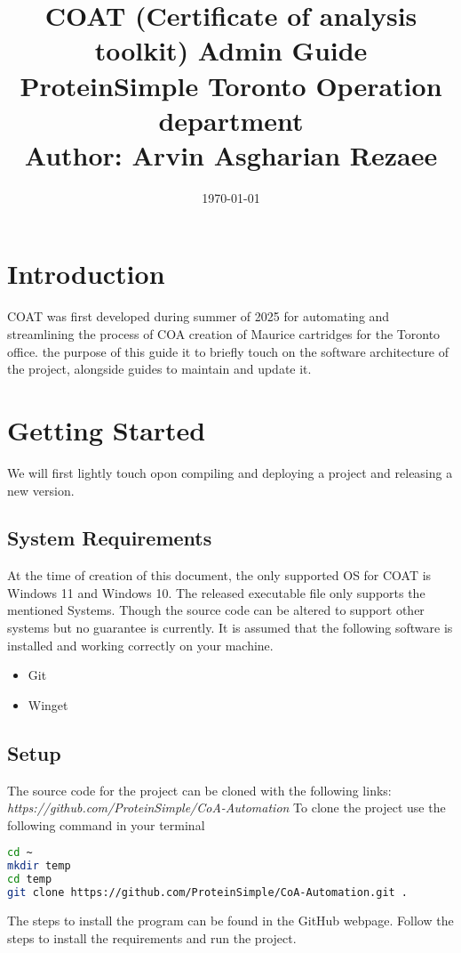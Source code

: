 \documentclass[12pt,a4paper]{article}
\title{
  \Huge \textbf{
    COAT (Certificate of analysis toolkit) Admin Guide} \\
    \vspace{1em}
  \large ProteinSimple Toronto Operation department \\
  \large Author: Arvin Asgharian Rezaee
  }
\author{}
\date{\today}
\begin{document}
\maketitle
\thispagestyle{empty}
\clearpage

\tableofcontents
\clearpage

\section{Introduction}
COAT was first developed during summer of 2025 for automating and streamlining the process of COA creation
of Maurice cartridges for the Toronto office. the purpose of this guide it to briefly touch on the 
software architecture of the project, alongside guides to maintain and update it.

\section{Getting Started}
We will first lightly touch opon compiling and deploying a project and releasing a new version.
\subsection{System Requirements}
At the time of creation of this document, the only supported OS for COAT is Windows 11 and Windows 10.
The released executable file only supports the mentioned Systems. Though the source code can be altered to
support other systems but no guarantee is currently. It is assumed that the following software is installed
and working correctly on your machine.
\begin{itemize}
  \item Git
  \item Winget
\end{itemize}

\subsection{Setup}
The source code for the project can be cloned with the following links: \newline
\textit{https://github.com/ProteinSimple/CoA-Automation} \newline
To clone the project use the following command in your terminal
\begin{lstlisting}[language=bash]
cd ~
mkdir temp
cd temp
git clone https://github.com/ProteinSimple/CoA-Automation.git .
\end{lstlisting}
The steps to install the program can be found in the GitHub webpage. Follow the steps to install the requirements
and run the project. 
\end{document}
